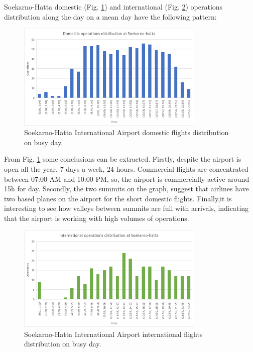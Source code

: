 Soekarno-Hatta domestic (Fig. \ref{hourDom}) and international (Fig. \ref{hourInt}) operations distribution along the day on a mean day have the following pattern:
\begin{figure}[H]
	\centering
	\includegraphics[clip, trim=0.1cm 0.1cm 0.1cm 0.1cm, width=0.8\textwidth]{./images/PROGNOSIS/hourDom}
	\caption{Soekarno-Hatta International Airport domestic flights distribution on busy day.}
	\label{hourDom}
\end{figure}
From Fig. \ref{hourDom} some conclusions can be extracted. Firstly, despite the airport is open all the year, 7 days a week, 24 hours. Commercial flights are concentrated between 07:00 AM and 10:00 PM, so, the airport is commercially active around 15h for day. Secondly, the two summits on the graph, suggest that airlines have two based planes on the airport for the short domestic flights. Finally,it is interesting to see how valleys between summits are full with arrivals, indicating that the airport is working with high volumes of operations.

\begin{figure}[H]
	\centering
	\includegraphics[clip, trim=0.1cm 0.1cm 0.1cm 0.1cm, width=0.8\textwidth]{./images/PROGNOSIS/hourInt}
	\caption{Soekarno-Hatta International Airport international flights distribution on busy day.}
	\label{hourInt}
\end{figure}


